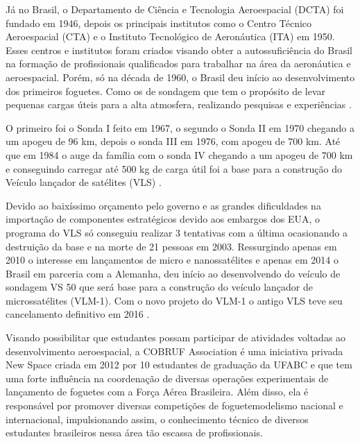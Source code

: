 




Já no Brasil, o Departamento de Ciência e Tecnologia Aeroespacial (DCTA) foi fundado em 1946, depois os principais institutos como o Centro Técnico Aeroespacial (CTA) e o Instituto Tecnológico de Aeronáutica (ITA) em 1950. Esses centros e institutos foram criados visando obter a autossuficiência do Brasil na formação de profissionais qualificados para trabalhar na área da aeronáutica e aeroespacial. Porém, só na década de 1960, o Brasil deu início ao desenvolvimento dos primeiros foguetes. Como os de sondagem que tem o propósito de levar pequenas cargas úteis para a alta atmosfera, realizando pesquisas e experiências \cite{INTRODUCAO_TECNOLOGIA_FOGUETES}.


O primeiro foi o Sonda I feito em 1967, o segundo o Sonda II em 1970 chegando a um apogeu  \footnotemark{} de 96 km, depois o  sonda III em 1976, com apogeu de 700 km. Até que em 1984 o auge da família com o sonda IV chegando a um apogeu de 700 km e conseguindo carregar até 500 kg de carga útil foi a base para a construção do Veículo lançador de satélites (VLS) \cite{Foguetes-AEB}.


Devido ao baixíssimo orçamento pelo governo e as grandes dificuldades na importação de componentes estratégicos devido aos embargos dos EUA, o programa do VLS só conseguiu realizar 3 tentativas com a última ocasionando a destruição da base e na morte de 21 pessoas em 2003. Ressurgindo apenas em 2010 o interesse em lançamentos de micro e nanossatélites e apenas em 2014 o Brasil em parceria com a Alemanha, deu início ao desenvolvendo do veículo de sondagem VS 50 que será base para a construção do veículo lançador de microssatélites (VLM-1). Com o novo projeto do VLM-1 o antigo VLS teve seu cancelamento definitivo em 2016 \cite{INTRODUCAO_TECNOLOGIA_FOGUETES}.



Visando possibilitar que estudantes possam participar de atividades voltadas ao desenvolvimento aeroespacial, a COBRUF Association é uma iniciativa privada New Space criada em 2012 por 10 estudantes de graduação da UFABC e que tem uma forte influência na coordenação de diversas operações experimentais de lançamento de foguetes com a Força Aérea Brasileira. Além disso, ela é responsável por promover diversas competições de foguetemodelismo nacional e internacional, impulsionando assim, o conhecimento técnico de diversos estudantes brasileiros nessa área tão escassa de profissionais\cite{Cobruf}.


